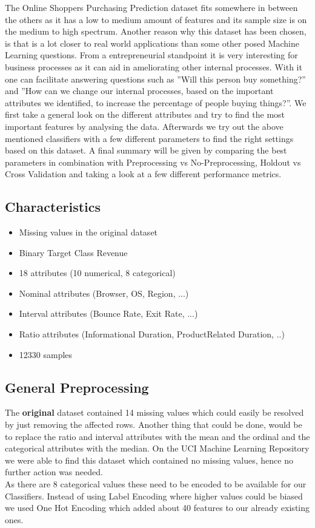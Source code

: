 \documentclass{article}
\begin{document}
The Online Shoppers Purchasing Prediction dataset fits somewhere in between the others as it has a low to medium amount of features and its sample size is on the medium to high spectrum. Another reason why  this dataset has been chosen, is that is a lot closer to real world applications than some other posed Machine Learning questions. From a entrepreneurial standpoint it is very interesting for business processes as it can aid in ameliorating other internal processes. With it one can facilitate answering questions such as ''Will this person buy something?'' and ''How can we change our internal processes, based on the important attributes we identified, to increase the percentage of people buying things?''. We first take a general look on the different attributes and try to find the most important features by analysing the data. Afterwards we try out the above mentioned classifiers with a few different parameters to find the right settings based on this dataset. A final summary will be given by comparing the best parameters in combination with Preprocessing vs No-Preprocessing, Holdout vs Cross Validation and taking a look at a few different performance metrics.

\subsection{Characteristics}

\begin{itemize}
\item Missing values in the original dataset
\item Binary Target Class Revenue
\item 18 attributes (10 numerical, 8 categorical)
\item Nominal attributes (Browser, OS, Region, ...)
\item Interval attributes (Bounce Rate, Exit Rate, ...)
\item Ratio attributes (Informational Duration, ProductRelated Duration, ..)
\item 12330 samples
\end{itemize}

\subsection{General Preprocessing} \label{GenPrepro}
The \textbf{original} dataset contained 14 missing values which could easily be resolved by just removing the affected rows. Another thing that could be done, would be to replace the ratio and interval attributes with the mean and the ordinal and the categorical attributes with the median. On the UCI Machine Learning Repository we were able to find this dataset which contained no missing values, hence no further action was needed. \\
\newline
As there are 8 categorical values these need to be encoded to be available for our Classifiers. Instead of using Label Encoding where higher values could be biased we used One Hot Encoding which added about 40 features to our already existing ones.
\end{document}
